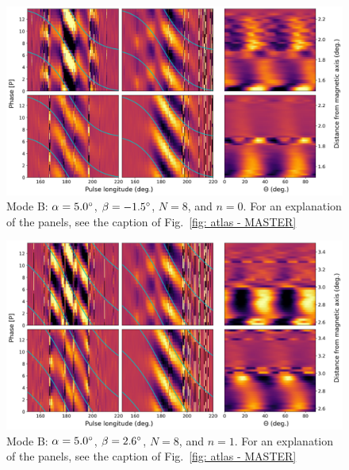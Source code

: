\begin{figure}
	\begin{center}
		\includegraphics[width=\atlasHeightFrac\textwidth]{Figures/B0031/atlas/B_517005008000_plots}
		\caption[Atlas results: Mode B -- $\alpha=5.0\degr$, $\beta=-1.5\degr$, $N=8$, $n=0$]{Mode B: $\alpha=5.0\degr$, $\beta=-1.5\degr$, $N=8$, and $n=0$. For an explanation of the panels, see the caption of Fig.~\ref{fig: atlas - MASTER} }
		\label{fig: atlas - B_517005008000}
	\end{center}
\end{figure}

\begin{figure}
	\begin{center}
		\includegraphics[width=\atlasHeightFrac\textwidth]{Figures/B0031/atlas/B_517005008001_plots}
		\caption[Atlas results: Mode B -- $\alpha=5.0\degr$, $\beta=2.6\degr$, $N=8$, $n=1$]{Mode B: $\alpha=5.0\degr$, $\beta=2.6\degr$, $N=8$, and $n=1$. For an explanation of the panels, see the caption of Fig.~\ref{fig: atlas - MASTER} }
		\label{fig: atlas - B_517005008001}
	\end{center}
\end{figure}

